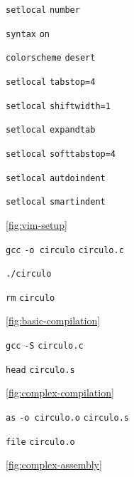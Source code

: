 \documentclass[11pt]{article}
\newcommand{\codetext}[2]{\large\texttt{\textcolor{#1}{#2}}}
\newcommand{\imagecaption}[1]{\vspace{-7pt}\caption*{\char91\ref{fig:#1}\char93}}
\begin{document}
		\begin{figure}[H]
			\centering
			\begin{code-box}
				\codetext{light-blue}{setlocal} \codetext{light-red}{number}
				
				\codetext{light-blue}{syntax} \codetext{light-red}{on}

				\codetext{light-blue}{colorscheme} \codetext{light-red}{desert}
				
				\codetext{light-blue}{setlocal} \codetext{light-red}{tabstop=4}

				\codetext{light-blue}{setlocal} \codetext{light-red}{shiftwidth=1}
				
				\codetext{light-blue}{setlocal} \codetext{light-red}{expandtab}
				
				\codetext{light-blue}{setlocal} \codetext{light-red}{softtabstop=4}
				
				\codetext{light-blue}{setlocal} \codetext{light-red}{autdoindent}
				
				\codetext{light-blue}{setlocal} \codetext{light-red}{smartindent}
			\end{code-box}
			\imagecaption{vim-setup}
		\end{figure}
		
		\begin{figure}[H]
			\centering
			\begin{code-box}
				\codetext{light-blue}{gcc} \codetext{orange-desert-vim}{-o circulo} \codetext{light-red}{circulo.c}
				
				\codetext{light-blue}{./circulo}
				
				\codetext{light-blue}{rm} \codetext{light-red}{circulo}
			\end{code-box}
			\imagecaption{basic-compilation}
		\end{figure}
		
		\begin{figure}[H]
			\centering
			\begin{code-box}
				\codetext{light-blue}{gcc} \codetext{orange-desert-vim}{-S} \codetext{light-red}{circulo.c}
				
				\codetext{light-blue}{head} \codetext{light-red}{circulo.s}
			\end{code-box}
			\imagecaption{complex-compilation}
		\end{figure}
		
		\begin{figure}[H]
			\centering
			\begin{code-box}
				\codetext{light-blue}{as} \codetext{orange-desert-vim}{-o circulo.o} \codetext{light-red}{circulo.s}
				
				\codetext{light-blue}{file} \codetext{light-red}{circulo.o}
			\end{code-box}
			\imagecaption{complex-assembly}
		\end{figure}
		
\end{document}
